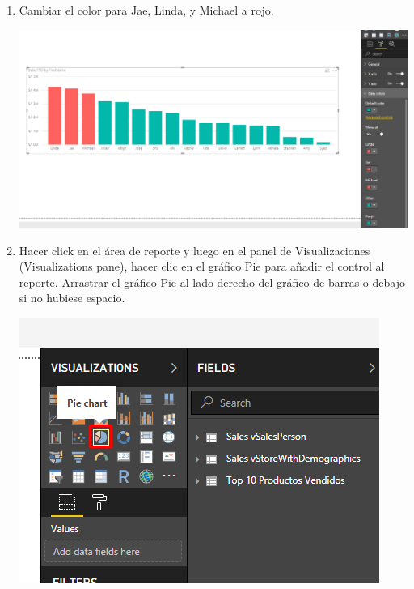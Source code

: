 \begin{itemize}
\begin{enumerate}
\item Cambiar el color para Jae, Linda, y Michael a rojo.
\begin{center}
\includegraphics[scale=0.55]{./Imagenes/7.png}
\end{center}

\item Hacer click en el área de reporte y luego en el panel de Visualizaciones (Visualizations pane), hacer clic en el gráfico Pie para añadir el control al reporte. Arrastrar el gráfico Pie al lado derecho del gráfico de barras o debajo si no hubiese espacio. 
\begin{center}
\includegraphics[scale=0.55]{./Imagenes/8.png}
\end{center}


\end{enumerate}
\end{itemize}

